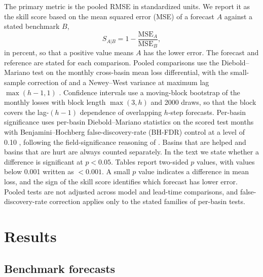 \documentclass[hess, manuscript]{copernicus}
\begin{document}
The primary metric is the pooled RMSE in standardized units. We report it
as the skill score based on the mean squared error (MSE) of a forecast $A$
against a stated benchmark $B$,
\begin{equation}
S_{A|B} = 1 - \frac{\mathrm{MSE}_{A}}{\mathrm{MSE}_{B}},
\end{equation}
in percent, so that a positive value means $A$ has the lower error. The
forecast and reference are stated for each comparison.
Pooled comparisons use the Diebold--Mariano test
\citep{diebold1995comparing} on the monthly cross-basin mean loss
differential, with the small-sample correction of
\citet{harvey1997testing} and a Newey--West variance at maximum lag
$\max(h-1, 1)$ \citep{newey1987hac}. Confidence intervals use a
moving-block bootstrap \citep{kunsch1989blockboot} of the monthly losses
with block length $\max(3, h)$ and 2000 draws, so that the block covers
the lag-$(h-1)$ dependence of overlapping $h$-step forecasts.
Per-basin significance uses per-basin Diebold--Mariano statistics on the
scored test months with Benjamini--Hochberg false-discovery-rate (BH-FDR)
control at a level of 0.10 \citep{benjamini1995fdr}, following the field-significance
reasoning of \citet{wilks2016stippling}. Basins that are helped and basins
that are hurt are always counted separately. In the text we state whether a
difference is significant at $p < 0.05$. Tables report two-sided $p$
values, with values below 0.001 written as $<0.001$. A small $p$ value
indicates a difference in mean loss, and the sign of the skill score identifies
which forecast has lower error. Pooled tests are not adjusted across model
and lead-time comparisons, and false-discovery-rate correction applies only
to the stated families of per-basin tests.

\section{Results}
\label{sec:results}

\subsection{Benchmark forecasts}
\label{sec:results-ladder}
\end{document}
